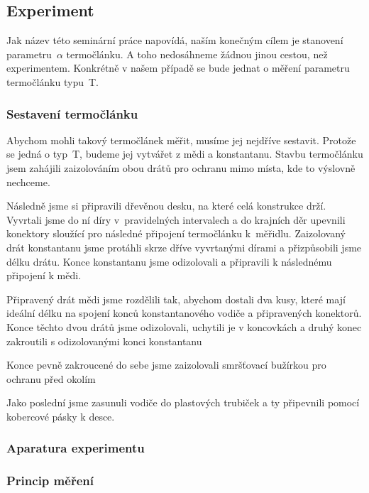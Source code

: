 \subsection{Experiment}
Jak název této seminární práce napovídá, naším konečným cílem je stanovení
parametru~$\alpha$ termočlánku. A toho nedosáhneme žádnou jinou cestou, než
experimentem. Konkrétně v našem případě se bude jednat o měření parametru
termočlánku typu~T.

\subsubsection{Sestavení termočlánku}
Abychom mohli takový termočlánek měřit, musíme jej nejdříve sestavit. Protože
se jedná o typ~T, budeme jej vytvářet z mědi a konstantanu. Stavbu termočlánku
jsem zahájili zaizolováním obou drátů pro ochranu mimo místa, kde to výslovně
nechceme.

Následně jsme si připravili dřevěnou desku, na které celá konstrukce drží.
Vyvrtali jsme do ní díry v~pravidelných intervalech a do krajních děr upevnili
konektory sloužící pro následné připojení termočlánku k~měřidlu.
Zaizolovaný drát konstantanu jsme protáhli skrze dříve vyvrtanými dírami 
a přizpůsobili jsme délku drátu. Konce konstantanu jsme odizolovali a připravili
k následnému připojení k mědi.

Připravený drát mědi jsme rozdělili tak, abychom dostali dva kusy, které mají
ideální délku na spojení konců konstantanového vodiče a připravených konektorů.
Konce těchto dvou drátů jsme odizolovali, uchytili je v koncovkách a druhý konec
zakroutili s odizolovanými konci konstantanu%

Konce pevně zakroucené do sebe jsme zaizolovali smršťovací bužírkou pro ochranu
před okolím

Jako poslední jsme zasunuli vodiče do plastových trubiček a ty připevnili
pomocí kobercové pásky k desce.

\subsubsection{Aparatura experimentu}

\subsubsection{Princip měření}
